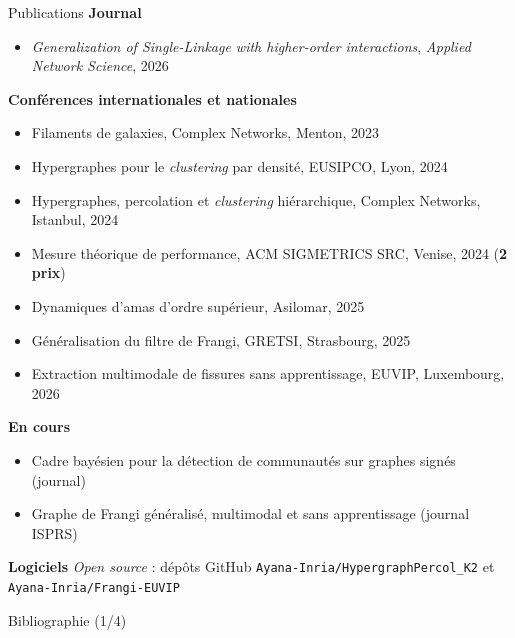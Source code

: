 \begin{frame}{Publications}
    \footnotesize
    \textbf{Journal}
    \begin{itemize}
        \item {} \emph{Generalization of Single-Linkage with higher-order interactions}, \textit{Applied Network Science}, 2026
    \end{itemize}
    \textbf{Conférences internationales et nationales}
    \begin{itemize}
        \item {} Filaments de galaxies, Complex Networks, Menton, 2023
        \item {} Hypergraphes pour le \emph{clustering} par densité, EUSIPCO, Lyon, 2024
        \item {} Hypergraphes, percolation et \emph{clustering} hiérarchique, Complex Networks, Istanbul, 2024
        \item {} Mesure théorique de performance, ACM SIGMETRICS SRC, Venise, 2024 (\textbf{2 prix})
        \item {} Dynamiques d'amas d'ordre supérieur, Asilomar, 2025
        \item {} Généralisation du filtre de Frangi, GRETSI, Strasbourg, 2025
        \item {} Extraction multimodale de fissures sans apprentissage, EUVIP, Luxembourg, 2026
    \end{itemize}
    \textbf{En cours}
    \begin{itemize}
        \item {} Cadre bayésien pour la détection de communautés sur graphes signés (journal)
        \item {} Graphe de Frangi généralisé, multimodal et sans apprentissage (journal ISPRS)
    \end{itemize}
    \textbf{Logiciels} \emph{Open source} : dépôts GitHub \texttt{Ayana-Inria/HypergraphPercol\_K2}
    et \texttt{Ayana-Inria/Frangi-EUVIP}
\end{frame}

\begin{frame}[label=bk-biblio]{Bibliographie (1/4)}
    \scriptsize
    \begin{itemize}
        \setlength{\itemsep}{2.5pt}
    \end{itemize}
\end{frame}

